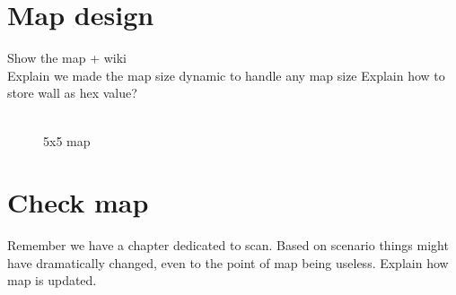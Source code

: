 \section{Map design}
\label{sec:map_design} %
Show the map + wiki\\
Explain we made the map size dynamic to handle any map size
Explain how to store wall as hex value?\\
\\
\begin{figure}[htp]
    \centering
    \hspace{0.2\textwidth}
    \caption{5x5 map}
    \label{fig:5x5map}
\end{figure}

\section{Check map}
\label{sec:map_check} %
Remember we have a chapter dedicated to scan.\linebreak
Based on scenario things might have dramatically changed, even to the point of map being useless. Explain how map is updated.

